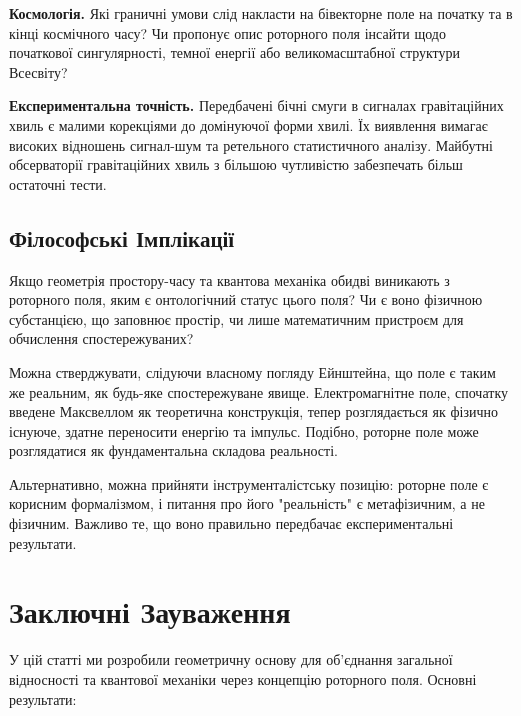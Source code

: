 \documentclass[11pt,a4paper]{article}
\numberwithin{equation}{section}
\theoremstyle{plain}
\theoremstyle{definition}
\theoremstyle{remark}
\begin{document}
\textbf{Космологія.} Які граничні умови слід накласти на бівекторне поле на початку та в кінці космічного часу? Чи пропонує опис роторного поля інсайти щодо початкової сингулярності, темної енергії або великомасштабної структури Всесвіту?

\textbf{Експериментальна точність.} Передбачені бічні смуги в сигналах гравітаційних хвиль є малими корекціями до домінуючої форми хвилі. Їх виявлення вимагає високих відношень сигнал-шум та ретельного статистичного аналізу. Майбутні обсерваторії гравітаційних хвиль з більшою чутливістю забезпечать більш остаточні тести.

\subsection{Філософські Імплікації}

Якщо геометрія простору-часу та квантова механіка обидві виникають з роторного поля, яким є онтологічний статус цього поля? Чи є воно фізичною субстанцією, що заповнює простір, чи лише математичним пристроєм для обчислення спостережуваних?

Можна стверджувати, слідуючи власному погляду Ейнштейна, що поле є таким же реальним, як будь-яке спостережуване явище. Електромагнітне поле, спочатку введене Максвеллом як теоретична конструкція, тепер розглядається як фізично існуюче, здатне переносити енергію та імпульс. Подібно, роторне поле може розглядатися як фундаментальна складова реальності.

Альтернативно, можна прийняти інструменталістську позицію: роторне поле є корисним формалізмом, і питання про його "реальність" є метафізичним, а не фізичним. Важливо те, що воно правильно передбачає експериментальні результати.

\section{Заключні Зауваження}
\label{sec:conclusion}

У цій статті ми розробили геометричну основу для об'єднання загальної відносності та квантової механіки через концепцію роторного поля. Основні результати:
\end{document}
